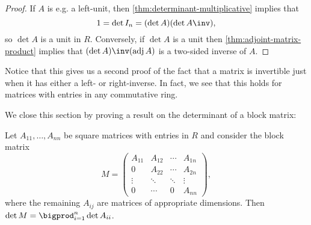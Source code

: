 \documentclass[a4paper, 11pt]{memoir}
\theoremstyle{plaincustomnumber}
\theoremstyle{changedotbreakcustomnumber}
\DeclareMathOperator{\adj}{adj}
\begin{document}
\begin{proof}
    If $A$ is e.g. a left-unit, then \cref{thm:determinant-multiplicative} implies that
    \begin{equation*}
        1
            = \det I_n
            = (\det A)(\det A\inv),
    \end{equation*}
    so $\det A$ is a unit in $R$. Conversely, if $\det A$ is a unit then \cref{thm:adjoint-matrix-product} implies that $(\det A)\inv(\adj A)$ is a two-sided inverse of $A$.
\end{proof}

Notice that this gives us a second proof of the fact that a matrix is invertible just when it has either a left- or right-inverse. In fact, we see that this holds for matrices with entries in any commutative ring.


\newpar

We close this section by proving a result on the determinant of a block matrix:

\begin{proposition}
    \label{prop:block-matrix-determinant}
    Let $A_{11}, \ldots, A_{nn}$ be square matrices with entries in $R$ and consider the block matrix
    \begin{equation*}
        M
            = \begin{pmatrix}
                A_{11} & A_{12} & \cdots & A_{1n} \\
                0      & A_{22} & \cdots & A_{2n} \\
                \vdots & \ddots & \ddots & \vdots \\
                0      & \cdots & 0      & A_{nn}
            \end{pmatrix},
    \end{equation*}
    where the remaining $A_{ij}$ are matrices of appropriate dimensions. Then $\det M = \bigprod_{i=1}^n \det A_{ii}$.
\end{proposition}
\end{document}
